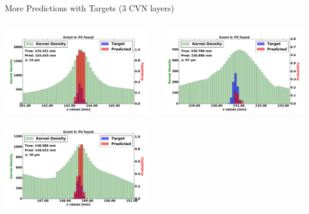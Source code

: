 \begin{frame}{More Predictions with Targets (3 CVN layers)}
  \begin{columns}[c]
        \begin{center}
            \includegraphics[width=1\textwidth,height=0.45\textwidth, trim=18 0 18 0]{images/120000_3layer_40.pdf}

            \includegraphics[width=1\textwidth, height=0.45\textwidth,trim=18 0 18 0]{images/120000_3layer_41.pdf}

        \end{center}
        \begin{center}
           \includegraphics[width=1\textwidth, height=0.45\textwidth, trim=18 0 18 0]{images/120000_3layer_42.pdf}


\end{center}
\end{columns}
\end{frame}

